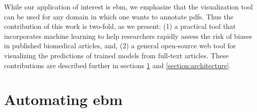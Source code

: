 \documentclass[runningheads,a4paper]{llncs}
\begin{document}
While our application of interest is \ac{ebm}, we emphasize that the visualization tool can be used for any domain in which one wants to annotate \acp{pdf}.
Thus the contribution of this work is two-fold, as we present:
(1) a practical tool that incorporates machine learning to help researchers rapidly assess the risk of biases in published biomedical articles, and,
(2) a general open-source web tool for visualizing the predictions of trained models from full-text articles.
These contributions are described further in sections \ref{section:EBM-ML} and \ref{section:architecture}.

\section{Automating \acl{ebm}}
\label{section:EBM-ML}


\end{document}
